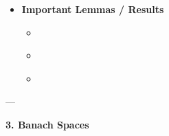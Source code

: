 \documentclass[12pt,a4paper]{report}
\begin{document}
\begin{description}
\begin{itemize}
            \begin{itemize}
            \item \textit{}

  * All norms on finite-dimensional spaces are equivalent

            \item \textit{}
  Equivalent:

            \begin{itemize}
                 \item   Continuous
                 \item   Continuous at 0
                 \item   Bounded
            \end{itemize}

            \item \textit{}

            \begin{itemize}
                 \item In infinite-dimensional spaces, unit ball is “large” 
                 \item Used to show non-compactness
            \end{itemize}

            \item \textit{}

  * Extend bounded linear functionals without increasing norm

            \end{itemize}
---

    \item \textbf{Important Lemmas / Results}

            \begin{itemize}
            \item \textit{}
            \item \textit{}
            \item \textit{}
            \end{itemize}

    \end{itemize}
---

\item \textbf{3. Banach Spaces}


\end{description}
\end{document}
